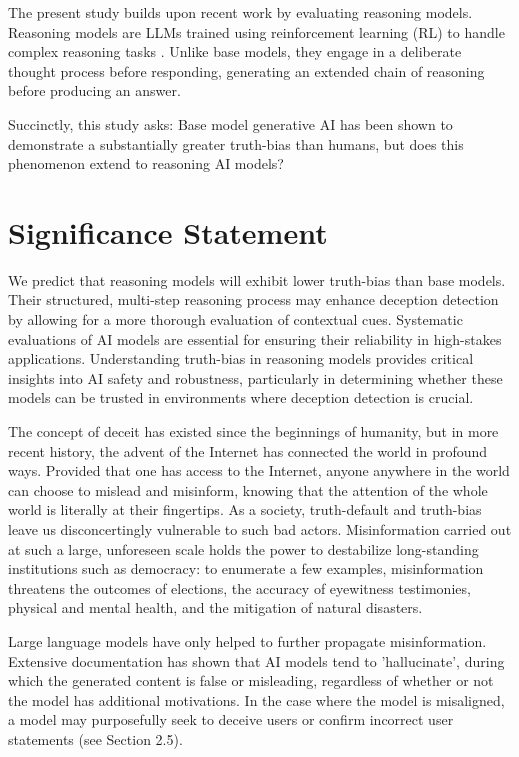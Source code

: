\documentclass{article}
\begin{document}
The present study builds upon recent work \citep{markowitz_generative_2024} by evaluating reasoning models. Reasoning models are LLMs trained using reinforcement learning (RL) to handle complex reasoning tasks \citep{openai_reasoning_2025}. Unlike base models, they engage in a deliberate thought process before responding, generating an extended chain of reasoning before producing an answer.

Succinctly, this study asks: Base model generative AI has been shown to demonstrate a substantially greater truth-bias than humans, but does this phenomenon extend to reasoning AI models?

\section{Significance Statement}

We predict that reasoning models will exhibit lower truth-bias than base models. Their structured, multi-step reasoning process may enhance deception detection by allowing for a more thorough evaluation of contextual cues. Systematic evaluations of AI models are essential for ensuring their reliability in high-stakes applications. Understanding truth-bias in reasoning models provides critical insights into AI safety and robustness, particularly in determining whether these models can be trusted in environments where deception detection is crucial.

The concept of deceit has existed since the beginnings of humanity, but in more recent history, the advent of the Internet has connected the world in profound ways. Provided that one has access to the Internet, anyone anywhere in the world can choose to mislead and misinform, knowing that the attention of the whole world is literally at their fingertips. As a society, truth-default and truth-bias leave us disconcertingly vulnerable to such bad actors. Misinformation carried out at such a large, unforeseen scale holds the power to destabilize long-standing institutions such as democracy: to enumerate a few examples, misinformation threatens the outcomes of elections, the accuracy of eyewitness testimonies, physical and mental health, and the mitigation of natural disasters. 

Large language models have only helped to further propagate misinformation. Extensive documentation has shown that AI models tend to 'hallucinate', during which the generated content is false or misleading, regardless of whether or not the model has additional motivations. In the case where the model is misaligned, a model may purposefully seek to deceive users or confirm incorrect user statements (see Section 2.5). 
\end{document}
